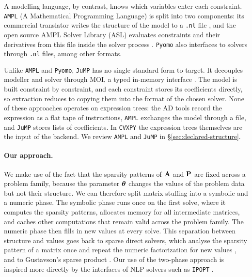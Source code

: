 A modelling language, by contrast, knows which variables enter each constraint.
\texttt{AMPL} (A Mathematical Programming Language) is split into two components: its commercial
translator writes the structure of the model to a \texttt{.nl} file
\cite{gay2005writing}, and the open source AMPL Solver Library (ASL) evaluates constraints
and their derivatives from this file inside the solver process \cite{gay1997hooking}.
\texttt{Pyomo} also interfaces to solvers through \texttt{.nl} files,
among other formats.

Unlike \texttt{AMPL} and \texttt{Pyomo}, \texttt{JuMP} has no single standard form to target.
It decouples modeller and solver through \ac{MOI}, a typed in-memory interface
\cite{legat2020mathoptinterface}.
The model is built constraint by constraint, and each constraint stores its coefficients directly,
so extraction reduces to copying them into the format of the chosen solver.
None of these approaches operates on expression trees: the AD tools record the expression as a
flat tape of instructions, \texttt{AMPL} exchanges the model through a file, and \texttt{JuMP}
stores lists of coefficients. In \texttt{CVXPY} the expression trees themselves are the input
of the backend.
We review \texttt{AMPL} and \texttt{JuMP} in \S\ref{sec:declared-structure}.

\paragraph{Our approach.}
We make use of the fact that the sparsity patterns of $\mathbf{A}$ and $\mathbf{P}$ are fixed
across a problem
family, because the parameter $\bm{\theta}$ changes the values of the problem data but not
their structure.
We can therefore split matrix stuffing into a symbolic and a numeric phase.
The symbolic phase runs once on the first solve, where it computes the sparsity patterns,
allocates memory for all intermediate matrices, and caches other computations that remain valid
across the problem family.
The numeric phase then fills in new values at every solve.
This separation between structure and values goes back to sparse direct solvers, which
analyse the sparsity pattern of a matrix once and repeat the numeric factorization for new
values \cite{davis2006direct}, and to Gustavson's sparse product \cite{gustavson1978two}.
Our use of the two-phase approach is inspired more directly by the interfaces of \ac{NLP}
solvers such as \texttt{IPOPT} \cite{wachter2006ipopt, cederberg2025disciplined}.

